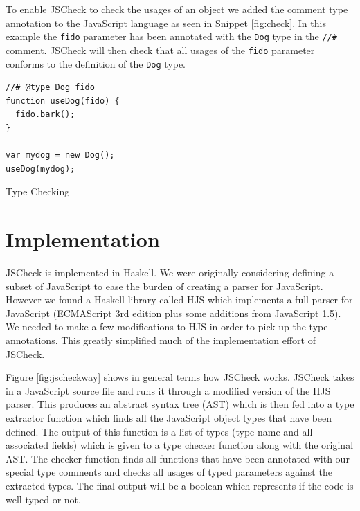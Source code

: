 \documentclass{article}
\begin{document}
To enable JSCheck to check the usages of an object we added the comment type annotation
to the JavaScript language as seen in Snippet \ref{fig:check}. In
this example the {\tt fido} parameter has been annotated with the {\tt Dog}
type in the {\tt //\#} comment. JSCheck will then check that all usages of
the {\tt fido} parameter conforms to the definition of the {\tt Dog} type.

\begin{program}[here]
\begin{verbatim}
//# @type Dog fido
function useDog(fido) {
  fido.bark();
}

var mydog = new Dog();
useDog(mydog);
\end{verbatim}
\caption{Type Checking}
\label{fig:check}
\end{program}
\pagebreak

\section{Implementation}
\label{sec:implementation}
JSCheck is implemented in Haskell. We were originally considering defining a 
subset of JavaScript to ease the burden of creating a parser for JavaScript. 
However we found a Haskell library called HJS \cite{hjsLibrary} 
which implements a full parser for JavaScript (ECMAScript 3rd edition plus 
some additions from JavaScript 1.5). We needed to make a few modifications to
HJS in order to pick up the type annotations. This greatly simplified much of
the implementation effort of JSCheck.

Figure \ref{fig:jscheckway} shows in general terms how JSCheck works. JSCheck takes 
in a JavaScript source file and runs
it through a modified version of the HJS parser. This produces an abstract syntax tree
(AST) which is then fed into a type extractor function which finds all the JavaScript 
object types that
have been defined. The output of this function is a list of types 
(type name and all associated fields)
which is given to a type checker function along with the original AST. The
checker function finds all functions that have been annotated with our special
type comments and checks all usages of typed parameters against the extracted types.
The final 
output will be a boolean which represents if the code is well-typed or not. 
\end{document}
